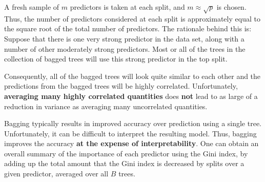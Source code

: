 \documentclass[11pt]{article}
\theoremstyle{definition}
\begin{document}
A fresh sample of $m$ predictors is taken at each split, and $m\approx \sqrt{p}$ is chosen. Thus, the number of predictors considered at each split is approximately equal to the square root of the total number of predictors. The rationale behind this is: Suppose that there is one very strong predictor in the data set, along with a number of other moderately strong predictors. Most or all of the trees in the collection of bagged trees will use this strong predictor in the top split. 

Consequently, all of the bagged trees will look quite similar to each other and the predictions from the bagged trees will be highly correlated. Unfortunately, \textbf{averaging many highly correlated quantities} does \textbf{not} lead to as large of a reduction in variance as averaging many uncorrelated quantities.

Bagging typically results in improved accuracy over prediction using a single tree. Unfortunately, it can be difficult to interpret the resulting model. Thus, bagging improves the accuracy \textbf{at the expense of interpretability}. One can obtain an overall summary of the importance of each predictor using the Gini index, by adding up the total amount that the Gini index is decreased by splits over a given predictor, averaged over all $B$ trees.
\end{document}
